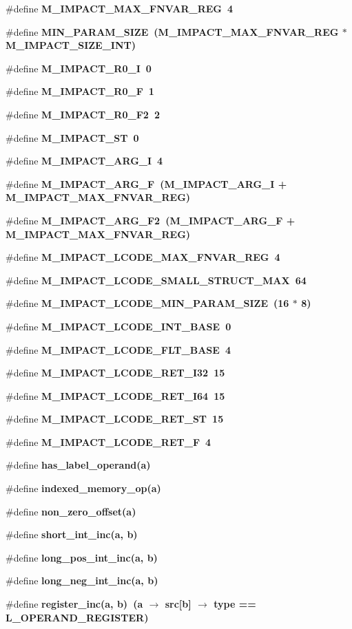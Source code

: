 \begin{CompactItemize}
\#define \bf{M\_\-IMPACT\_\-MAX\_\-FNVAR\_\-REG}~4
\item 
\#define \bf{MIN\_\-PARAM\_\-SIZE}~(M\_\-IMPACT\_\-MAX\_\-FNVAR\_\-REG $\ast$ M\_\-IMPACT\_\-SIZE\_\-INT)
\item 
\#define \bf{M\_\-IMPACT\_\-R0\_\-I}~0
\item 
\#define \bf{M\_\-IMPACT\_\-R0\_\-F}~1
\item 
\#define \bf{M\_\-IMPACT\_\-R0\_\-F2}~2
\item 
\#define \bf{M\_\-IMPACT\_\-ST}~0
\item 
\#define \bf{M\_\-IMPACT\_\-ARG\_\-I}~4
\item 
\#define \bf{M\_\-IMPACT\_\-ARG\_\-F}~(M\_\-IMPACT\_\-ARG\_\-I + M\_\-IMPACT\_\-MAX\_\-FNVAR\_\-REG)
\item 
\#define \bf{M\_\-IMPACT\_\-ARG\_\-F2}~(M\_\-IMPACT\_\-ARG\_\-F + M\_\-IMPACT\_\-MAX\_\-FNVAR\_\-REG)
\item 
\#define \bf{M\_\-IMPACT\_\-LCODE\_\-MAX\_\-FNVAR\_\-REG}~4
\item 
\#define \bf{M\_\-IMPACT\_\-LCODE\_\-SMALL\_\-STRUCT\_\-MAX}~64
\item 
\#define \bf{M\_\-IMPACT\_\-LCODE\_\-MIN\_\-PARAM\_\-SIZE}~(16 $\ast$ 8)
\item 
\#define \bf{M\_\-IMPACT\_\-LCODE\_\-INT\_\-BASE}~0
\item 
\#define \bf{M\_\-IMPACT\_\-LCODE\_\-FLT\_\-BASE}~4
\item 
\#define \bf{M\_\-IMPACT\_\-LCODE\_\-RET\_\-I32}~15
\item 
\#define \bf{M\_\-IMPACT\_\-LCODE\_\-RET\_\-I64}~15
\item 
\#define \bf{M\_\-IMPACT\_\-LCODE\_\-RET\_\-ST}~15
\item 
\#define \bf{M\_\-IMPACT\_\-LCODE\_\-RET\_\-F}~4
\item 
\#define \bf{has\_\-label\_\-operand}(a)
\item 
\#define \bf{indexed\_\-memory\_\-op}(a)
\item 
\#define \bf{non\_\-zero\_\-offset}(a)
\item 
\#define \bf{short\_\-int\_\-inc}(a, b)
\item 
\#define \bf{long\_\-pos\_\-int\_\-inc}(a, b)
\item 
\#define \bf{long\_\-neg\_\-int\_\-inc}(a, b)
\item 
\#define \bf{register\_\-inc}(a, b)~(a $\rightarrow$ src[b] $\rightarrow$ type == L\_\-OPERAND\_\-REGISTER)
\end{CompactItemize}
